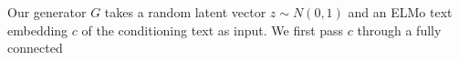 Our generator $G$ takes a random latent vector $z \sim N(0, 1)$ and an ELMo text embedding $c$ of the conditioning text as input. We first pass $c$ through a fully connected  